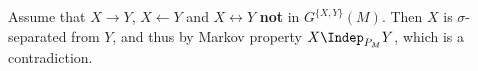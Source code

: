 \begin{enumerate}
	\begin{ungradedsolution}
		Assume that $X \to Y$, $X \leftarrow Y$ and $X \leftrightarrow Y$ \textbf{not} in $G^{\{X,Y\}}(M)$. Then $X$ is $\sigma$-separated from $Y$, and thus by Markov property $X \Indep_{P_{M}} Y$, which is a contradiction.
	\end{ungradedsolution}

\end{enumerate}

